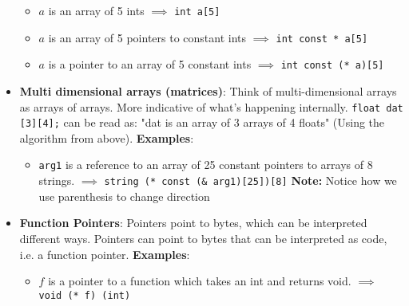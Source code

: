\documentclass{report}
\begin{document}
\begin{itemize}
\begin{itemize}
                \item $a$ is an array of 5 ints $\implies$ \texttt{int a[5]}
                \item $a$ is an array of 5 pointers to constant ints $\implies$ \texttt{int const * a[5]}
                \item $a$ is a pointer to an array of 5 constant ints $\implies$ \texttt{int const (* a)[5]}
            \end{itemize}
        \item \textbf{Multi dimensional arrays (matrices)}: Think of multi-dimensional arrays as arrays of arrays. More indicative of what’s happening internally. \texttt{float dat [3][4];} can be read as: "dat is an array of 3 arrays of 4 floats" (Using the algorithm from above).
            \bigbreak \noindent 
            \textbf{Examples}:
            \begin{itemize}
                \item \texttt{arg1} is a reference to an array of 25 constant pointers to arrays of 8 strings. $\implies$ \texttt{string (* const (\& arg1)[25])[8]}
                    \bigbreak \noindent 
                    \textbf{Note:} Notice how we use parenthesis to change direction
            \end{itemize}
        \item \textbf{Function Pointers}: Pointers point to bytes, which can be interpreted different ways. Pointers can point to bytes that can be interpreted as code, i.e. a function pointer.
            \bigbreak \noindent 
            \textbf{Examples}: 
            \begin{itemize}
                \item $f$ is a pointer to a function which takes an int and returns void. $\implies$ \texttt{void (* f) (int)}
            \end{itemize}
    \end{itemize}

   \pagebreak 
\end{document}
